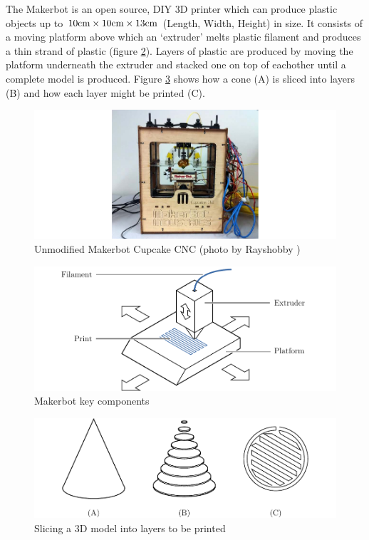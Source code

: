 		\label{sec:makerbot_basics}
		
		The Makerbot is an open source, DIY 3D printer which can produce plastic
		objects up to $10\textrm{cm}\times10\textrm{cm}\times13\textrm{cm}$ (Length, Width, Height) in size.
		It consists of a moving platform above which an `extruder' melts plastic
		filament and produces a thin strand of plastic (figure
		\ref{fig:printerBasics}). Layers of plastic are produced by moving the
		platform underneath the extruder and stacked one on top of eachother until a
		complete model is produced. Figure \ref{fig:slicing} shows how a cone (A)
		is sliced into layers (B) and how each layer might be printed (C).
	
		\begin{figure}
			\includegraphics[width=1\textwidth]{diagrams/makerbotOrig.pdf}
			\caption{Unmodified Makerbot Cupcake CNC (photo by Rayshobby
			         \cite{rayshobby})}
			\label{fig:makerbotOrig}
		\end{figure}
	
		\begin{figure}
			\includegraphics[width=1\textwidth]{diagrams/printerBasics.pdf}
			\caption{Makerbot key components}
			\label{fig:printerBasics}
		\end{figure}
		
		\begin{figure}
			\includegraphics[width=1\textwidth]{diagrams/slicing.pdf}
			\caption{Slicing a 3D model into layers to be printed}
			\label{fig:slicing}
		\end{figure}
		
